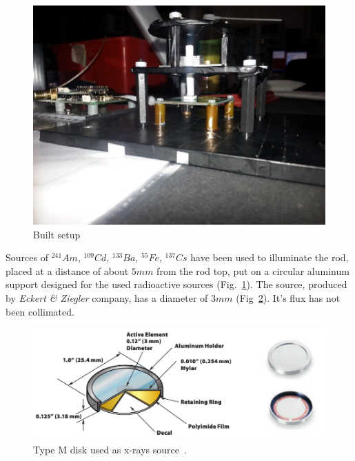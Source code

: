 \documentclass[10pt,a4paper, openany]{book}
\begin{document}
\begin{figure}[!h]
\begin{center}
\includegraphics[scale=0.28]{imm/support1.jpg}
\end{center}
\caption{Built setup}
\label{fig:support1}
\end{figure}
\newpage
Sources of $^{241}Am$, $^{109}Cd$, $^{133}Ba$, $^{55}Fe$, $^{137}Cs$ have been used to illuminate the rod, placed at a distance of about $5mm$ from the rod top, put on a circular aluminum support designed for the used radioactive sources (Fig.~\ref{fig:support1}). The source, produced by \emph{Eckert \& Ziegler} company, has a diameter of $3mm$ (Fig~\ref{fig:source}). It's flux has not been collimated.\\

\begin{figure}[!h]
\begin{center}
\includegraphics[scale=0.4]{imm/source.png}
\end{center}
\caption{Type M disk used as x-rays source~\cite{instr:sou}. }
\label{fig:source}
\end{figure}
\end{document}

